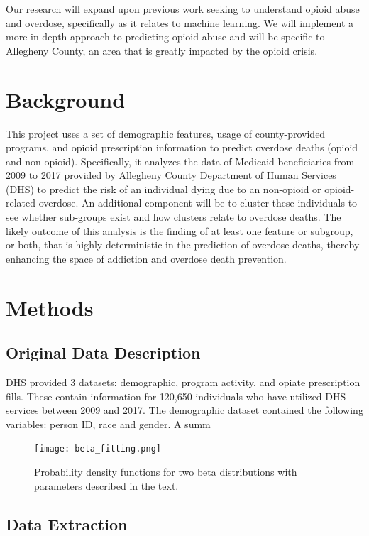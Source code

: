\documentclass[twoside,10.5pt]{article}
\let\footnote=\endnote
\begin{document}
Our research will expand upon previous work seeking to understand opioid abuse and overdose, specifically as it relates to machine learning. We will implement a more in-depth approach to predicting opioid abuse and will be specific to Allegheny County, an area that is greatly impacted by the opioid crisis\footnote{\cite{Allegheny}}. 

\section{Background}
This project uses a set of demographic features, usage of county-provided programs, and opioid prescription information to predict overdose deaths (opioid and non-opioid). Specifically, it analyzes the data of Medicaid beneficiaries from 2009 to 2017 provided by Allegheny County Department of Human Services (DHS) to predict the risk of an individual dying due to an non-opioid or opioid-related overdose. An additional component will be to cluster these individuals to see whether sub-groups exist and how clusters relate to overdose deaths. The likely outcome of this analysis is the finding of at least one feature or subgroup, or both, that is highly deterministic in the prediction of overdose deaths, thereby enhancing the space of addiction and overdose death prevention. 

\section{Methods}
\subsection{Original Data Description}
DHS provided 3 datasets: demographic, program activity, and opiate prescription fills. These contain information for 120,650 individuals who have utilized DHS services between 2009 and 2017. The demographic dataset contained the following variables: person ID, race and gender. A summ

\begin{figure}
\begin{center}
\texttt{[image: beta\_fitting.png]}
\end{center}
\caption{Probability density functions for two beta distributions with parameters described in the text.}
\end{figure}

\subsection{Data Extraction}
\end{document}
